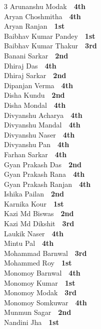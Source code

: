 \documentclass[11pt,a4paper]{article}
\begin{document}
\begin{multicols}{3}
Arunanshu Modak~\dotfill~\textbf{4th}\\
Aryan Choshmitha~\dotfill~\textbf{4th}\\
Aryan Ranjan~\dotfill~\textbf{1st}\\
Baibhav Kumar Pandey~\dotfill~\textbf{1st}\\
Baibhav Kumar Thakur~\dotfill~\textbf{3rd}\\
Banani Sarkar~\dotfill~\textbf{2nd}\\
Dhiraj Das~\dotfill~\textbf{4th}\\
Dhiraj Sarkar~\dotfill~\textbf{2nd}\\
Dipanjan Verma~\dotfill~\textbf{4th}\\
Disha Kundu~\dotfill~\textbf{2nd}\\
Disha Mondal~\dotfill~\textbf{4th}\\
Divyanshu Acharya~\dotfill~\textbf{4th}\\
Divyanshu Mandal~\dotfill~\textbf{4th}\\
Divyanshu Naser~\dotfill~\textbf{4th}\\
Divyanshu Pan~\dotfill~\textbf{4th}\\
Farhan Sarkar~\dotfill~\textbf{4th}\\
Gyan Prakash Das~\dotfill~\textbf{2nd}\\
Gyan Prakash Rana~\dotfill~\textbf{4th}\\
Gyan Prakash Ranjan~\dotfill~\textbf{4th}\\
Ishika Pailan~\dotfill~\textbf{2nd}\\
Karnika Kour~\dotfill~\textbf{1st}\\
Kazi Md Biswas~\dotfill~\textbf{2nd}\\
Kazi Md Dikshit~\dotfill~\textbf{3rd}\\
Laukik Naser~\dotfill~\textbf{4th}\\
Mintu Pal~\dotfill~\textbf{4th}\\
Mohammad Barnwal~\dotfill~\textbf{3rd}\\
Mohammed Roy~\dotfill~\textbf{1st}\\
Monomoy Barnwal~\dotfill~\textbf{4th}\\
Monomoy Kumar~\dotfill~\textbf{1st}\\
Monomoy Modak~\dotfill~\textbf{3rd}\\
Monomoy Somkuwar~\dotfill~\textbf{4th}\\
Munmun Sagar~\dotfill~\textbf{2nd}\\
Nandini Jha~\dotfill~\textbf{1st}\\

\end{multicols}
\end{document}
